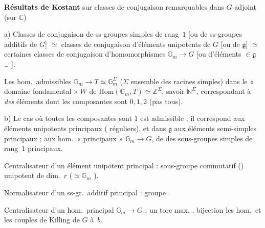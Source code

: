 \documentclass[11pt,a4paper]{article}
\begin{document}


\textbf{Résultats de Kostant} sur classes de conjugaison remarquables dans $G$
 adjoint (sur $\mathbb{C}$)

a) Classes de conjugaison de ss-groupes simples de rang~$1$
\struck{\ill{}} [ou de ss-groupes additifs de $G$] $\simeq$ classes de
conjugaison d'éléments unipotents de $G$ [ou de $\mathfrak{g}$]
$\simeq$ certaines classes de conjugaison
d'homomorphismes $\mathbb{G}_m \to G$ [ou d'éléments $\in \mathfrak{g}$ … ].

Les hom.\ admissibles $\mathbb{G}_m \to T \simeq \mathbb{G}_m^{\Sigma}$
($\Sigma$ ensemble des racines simples) dans le « domaine fondamental » $W$ de
$\mathrm{Hom}(\mathbb{G}_m, T) \simeq \mathbb{Z}^{\Sigma}$, savoir
$\mathbb{N}^{\Sigma}$, correspondant à \emph{des} éléments dont les composantes
sont $0, 1, 2$ (pas tous).

b) Le cas où toutes les composantes sont $1$ est admissible ; il correspond
aux éléments unipotents principaux ( réguliers), et dans
$\mathfrak{g}$ aux éléments semi-simples principaux ;
\struck{\ill{}} aux hom.\ « principaux » $\mathbb{G}_m \to G$, de
 des sous-groupes simples de rang~$1$ principaux.

Centralisateur d'un élément unipotent principal : sous-groupe commutatif
() unipotent de dim.\ $r$ ($\simeq \mathbb{G}_m$
 \ill{}  ).

Normalisateur d'un ss-gr.\ additif principal : groupe 
\struck{\ill{}} \ill{} \ill{}.

Centralisateur d'un hom.\ principal $\mathbb{G}_m \to G$ : un tore max.
.  \ill{} bijection  les hom.\ et
les couples de Killing de $G$  à~$b$.
\end{document}
